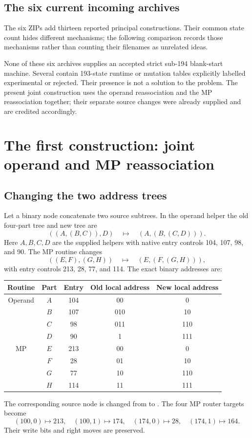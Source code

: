 \documentclass[11pt,a4paper]{article}
\begin{document}
\subsection{The six current incoming archives}
The six ZIPs add thirteen reported principal constructions. Their common
state count hides different mechanisms; the following comparison records
those mechanisms rather than counting their filenames as unrelated ideas.


None of these six archives supplies an accepted strict sub-194 blank-start
machine. Several contain 193-state runtime or mutation tables explicitly
labelled experimental or rejected. Their presence is not a solution to
the problem. The present joint construction uses the operand reassociation
and the MP reassociation together; their separate source changes were
already supplied and are credited accordingly.

\section{The first construction: joint operand and MP reassociation}
\label{sec:construction}

\subsection{Changing the two address trees}
Let a binary node concatenate two source subtrees. In the operand helper
the old four-part tree and new tree are
\[
 ((A,(B,C)),D)\quad\longmapsto\quad(A,(B,(C,D))).
\]
Here $A,B,C,D$ are the supplied helpers with native entry controls
104, 107, 98, and 90. The MP routine changes
\[
 ((E,F),(G,H))\quad\longmapsto\quad(E,(F,(G,H))),
\]
with entry controls 213, 28, 77, and 114. The exact binary addresses are:
\begin{center}
\begin{tabular}{ccccc}
\toprule
Routine & Part & Entry & Old local address & New local address\\
\midrule
Operand & $A$ & 104 & 00 & 0\\
 & $B$ & 107 & 010 & 10\\
 & $C$ & 98 & 011 & 110\\
 & $D$ & 90 & 1 & 111\\
\midrule
MP & $E$ & 213 & 00 & 0\\
 & $F$ & 28 & 01 & 10\\
 & $G$ & 77 & 10 & 110\\
 & $H$ & 114 & 11 & 111\\
\bottomrule
\end{tabular}
\end{center}
The corresponding source node is changed from
 to
.
The four MP router targets become
\[
 (100,0)\mapsto213,\quad(100,1)\mapsto174,\quad
 (174,0)\mapsto28,\quad(174,1)\mapsto164.
\]
Their write bits and right moves are preserved.
\end{document}
